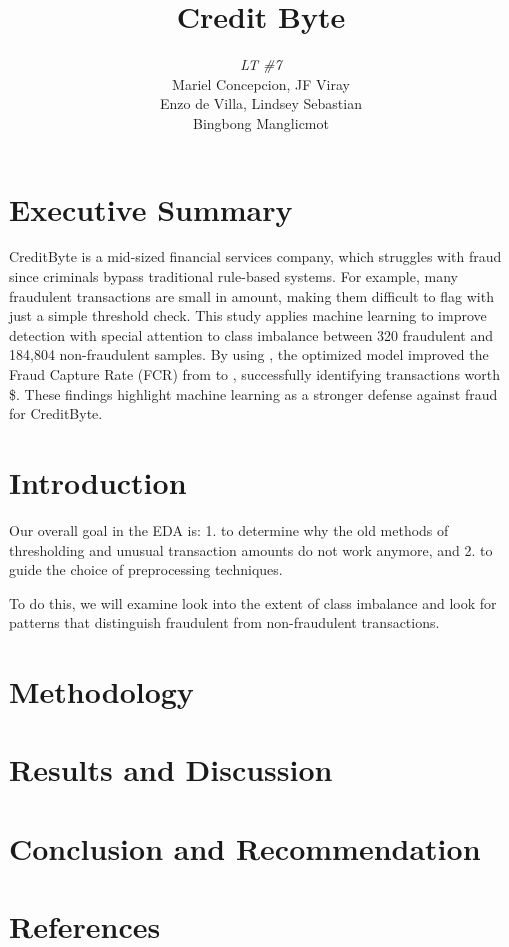 \documentclass{extarticle}
\title{\vspace{-2em}Credit Byte}
\author{
  \emph{LT \#7} \\[0.5em]
  Mariel Concepcion, JF Viray \\ 
  Enzo de Villa, Lindsey Sebastian \\ 
  Bingbong Manglicmot
}
\begin{document}
\maketitle

\section{Executive Summary}
CreditByte is a mid-sized financial services company, which struggles with fraud since criminals bypass traditional rule-based systems. 
For example, many fraudulent transactions are small in amount, making them difficult to flag with just a simple threshold check. 
This study applies machine learning to improve detection with special attention to class imbalance between 320 fraudulent and 184,804 non-fraudulent samples.
By using \underline{\hspace{5cm}}, the optimized model improved the Fraud Capture Rate (FCR) from \underline{\hspace{5cm}} to \underline{\hspace{5cm}}, successfully identifying transactions worth \$\underline{\hspace{5cm}}. 
These findings highlight machine learning as a stronger defense against fraud for CreditByte.

\section{Introduction}
Our overall goal in the EDA is:
1. to determine why the old methods of thresholding and unusual transaction amounts do not work anymore, and 
2. to guide the choice of preprocessing techniques. 

To do this, we will examine look into the extent of class imbalance and look for patterns that distinguish fraudulent from non-fraudulent transactions.
\section{Methodology}

\section{Results and Discussion}

\section{Conclusion and Recommendation}

\section{References}
\end{document}

